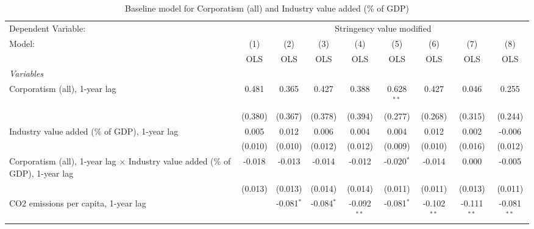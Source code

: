 
\begin{table}[htbp]
   \caption{Baseline model for Corporatism (all) and Industry value added (\% of GDP)}
   \centering
   \begin{tabular}{lcccccccc}
      \toprule
      Dependent Variable: & \multicolumn{8}{c}{Stringency value modified}\\
      Model:                                                                                & (1)     & (2)          & (3)          & (4)           & (5)           & (6)           & (7)           & (8)\\  
                                                                                            &  OLS    & OLS          & OLS          & OLS           & OLS           & OLS           & OLS           & OLS\\  
      \midrule
      \emph{Variables}\\
      Corporatism (all), 1-year lag                                                         & 0.481   & 0.365        & 0.427        & 0.388         & 0.628$^{**}$  & 0.427         & 0.046         & 0.255\\   
                                                                                            & (0.380) & (0.367)      & (0.378)      & (0.394)       & (0.277)       & (0.268)       & (0.315)       & (0.244)\\   
      Industry value added (\% of GDP), 1-year lag                                          & 0.005   & 0.012        & 0.006        & 0.004         & 0.004         & 0.012         & 0.002         & -0.006\\   
                                                                                            & (0.010) & (0.010)      & (0.012)      & (0.012)       & (0.009)       & (0.010)       & (0.016)       & (0.012)\\   
      Corporatism (all), 1-year lag $\times$ Industry value added (\% of GDP), 1-year lag   & -0.018  & -0.013       & -0.014       & -0.012        & -0.020$^{*}$  & -0.014        & 0.000         & -0.005\\   
                                                                                            & (0.013) & (0.013)      & (0.014)      & (0.014)       & (0.011)       & (0.011)       & (0.013)       & (0.011)\\   
      CO2 emissions per capita, 1-year lag                                                  &         & -0.081$^{*}$ & -0.084$^{*}$ & -0.092$^{**}$ & -0.081$^{*}$  & -0.102$^{**}$ & -0.111$^{**}$ & -0.081$^{**}$\\   

\end{tabular}
\end{table}
